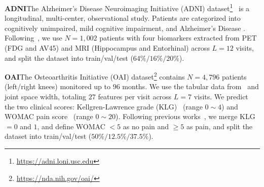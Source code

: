 \textbf{ADNI}\quad The Alzheimer's Disease Neuroimaging Initiative (ADNI) dataset\footnote{\url{https://adni.loni.usc.edu}}~\citep{petersen2010alzheimer} is a longitudinal, multi-center, observational study. Patients are categorized into cognitively unimpaired, mild cognitive impairment, and Alzheimer's Disease \citep{o2008staging, o2010validation}. Following~\citet{qin2024risk}, we use $N=1,002$ patients with four biomarkers extracted from PET (FDG and AV45) and MRI (Hippocampus and Entorhinal) across $L=12$ visits, and split the dataset into train/val/test ($64\%/16\%/20\%$). 

\textbf{OAI}\quad The Osteoarthritis Initiative (OAI) dataset\footnote{\url{https://nda.nih.gov/oai/}} contains $N=4,796$ patients (left/right knees) monitored up to $96$ months. We use the tabular data from~\citet{chen2024unified} and joint space width, totaling $27$ features per visit across $L=7$ visits. We predict the two clinical scores: Kellgren-Lawrence grade (KLG)~\citep{kellgren1957radiological} (range $0 \sim 4$) and WOMAC pain score~\citep{mcconnell2001western} (range $0 \sim 20$). Following previous works~\citep{chen2024unified,nguyen2024active}, we merge KLG $=0$ and $1$, and define WOMAC $<5$ as no pain and $\geq 5$ as pain, and split the dataset into train/val/test ($50\%/12.5\%/37.5\%$). 

